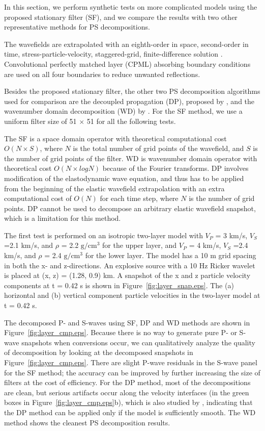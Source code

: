 \documentclass[manuscript,ulem,graphix,revised]{geophysics}
\begin{document}
In this section, we perform synthetic tests on more complicated models using the proposed stationary filter (SF), and we compare the results with two other representative methods for PS decompositions. 

The wavefields are extrapolated with an eighth-order in space, second-order in time, stress-particle-velocity, staggered-grid, finite-difference solution \citep{virieux86}. Convolutional perfectly matched layer (CPML) absorbing boundary conditions \citep{komatitsch07} are used on all four boundaries to reduce unwanted reflections. 

Besides the proposed stationary filter, the other two PS decomposition algorithms used for comparison are the decoupled propagation (DP), proposed by \citet{ma03}, and the wavenumber domain decomposition (WD) by \citet{zhang10}. For the SF method, we use a uniform filter size of 51 $\times$ 51 for all the following tests. 

The SF is a space domain operator with theoretical computational cost $O(N \times S)$, where $N$ is the total number of grid points of the wavefield, and $S$ is the number of grid points of the filter. WD is wavenumber domain operator with theoretical cost $O(N \times logN)$ because of the Fourier transforms. DP involves modification of the elastodynamic wave equation, and thus has to be applied from the beginning of the elastic wavefield extrapolation with an extra computational cost of $O(N)$ for each time step, where $N$ is the number of grid points. DP cannot be used to decompose an arbitrary elastic wavefield snapshot, which is a limitation for this method.

The first test is performed on an isotropic two-layer model with $V_P$ = 3 km/s, $V_S$ =2.1 km/s, and $\rho$ = 2.2 $\mathrm{g/cm^3}$ for the upper layer, and $V_P$ = 4 km/s, $V_S$ =2.4 km/s, and $\rho$ = 2.4 $\mathrm{g/cm^3}$ for the lower layer. 
The model has a 10 m grid spacing in both the x- and z-directions. An explosive source with a 10 Hz Ricker wavelet is placed at (x, z) = (1.28, 0.9) km. A snapshot of the x and z particle velocity components at t = 0.42 s is shown in Figure~\ref{fig:layer_snap.eps}.
{
The (a) horizontal and (b) vertical component particle velocities in the two-layer model at t = 0.42 s.
}

The decomposed P- and S-waves using SF, DP and WD methods are shown in Figure~\ref{fig:layer_cmp.eps}. Because there is no way to generate pure P- or S-wave snapshots when conversions occur, we can qualitatively analyze the quality of decomposition by looking at the decomposed snapshots in Figure~\ref{fig:layer_cmp.eps}. There are slight P-wave residuals in the S-wave panel for the SF method; the accuracy can be improved by further increasing the size of filters at the cost of efficiency. For the DP method, most of the decompositions are clean, but serious artifacts occur along the velocity interfaces (in the green boxes in Figure~\ref{fig:layer_cmp.eps}b), which is also studied by \citet{wenlong_cmp15}, indicating that the DP method can be applied only if the model is sufficiently smooth. The WD method shows the cleanest PS decomposition results. 
\end{document}

